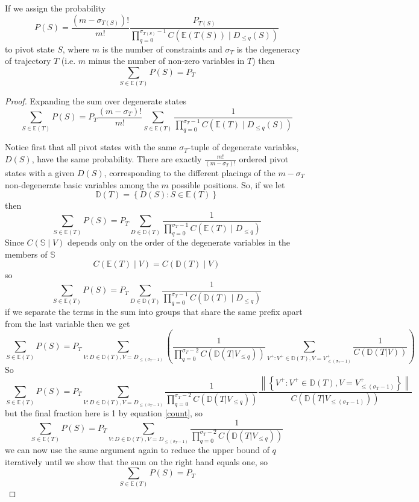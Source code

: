 \begin{theorem}
If we assign the probability
\begin{equation}
P(S) =  \frac{(m-\sigma_{T(S)})!}{m!} \frac{P_{T(S)}}{\prod_{q=0}^{\sigma_{T(S)}-1} C(\mathbb{E}(T(S)) \mid D_{\le q}(S))}
\label{pivotProb}
\end{equation}
to pivot state $S$, where $m$ is the number of constraints and $\sigma_{T}$ is the degeneracy of trajectory $T$ (i.e. $m$ minus the number of non-zero variables in $T$) then
\[
\sum_{S \in \mathbb{E}(T)} P(S) = P_{T}
\]
\end{theorem}
\begin{proof}
Expanding the sum over degenerate states
\[
\sum_{S \in \mathbb{E}(T)} P(S) =
P_T \frac{(m-\sigma_T)!}{m!} \sum_{S \in \mathbb{E}(T)} \frac{1}{\prod_{q=0}^{\sigma_T-1} C(\mathbb{E}(T) \mid D_{\le q}(S))}
\]

Notice first that all pivot states with the same $\sigma_T$-tuple of degenerate variables, $D(S)$, have the same probability. There are exactly $\frac{m!}{(m-\sigma_T)!}$ ordered pivot states with a given $D(S)$, corresponding to the different placings of the $m-\sigma_T$ non-degenerate basic variables among the $m$ possible positions. So, if we let
\[
\mathbb{D}(T) = \left\{ D(S) : S \in \mathbb{E}(T) \right\}
\]
then
\[
\sum_{S \in \mathbb{E}(T)} P(S) = P_T \sum_{D \in \mathbb{D}(T)} \frac{1}{\prod_{q=0}^{\sigma_T-1} C(\mathbb{E}(T) \mid D_{\le q})}
\]
Since $C(\mathbb{S} \mid V)$ depends only on the order of the degenerate variables in the members of $\mathbb{S}$
\[
C(\mathbb{E}(T) \mid V) = C(\mathbb{D}(T) \mid V)
\]
so
\begin{equation}
\sum_{S \in \mathbb{E}(T)} P(S) = P_T \sum_{D \in \mathbb{D}(T)} \frac{1}{\prod_{q=0}^{\sigma_T-1} C(\mathbb{D}(T) \mid D_{\le q})}
\label{normalForm}
\end{equation}
if we separate the terms in the sum into groups that share the same prefix apart from the last variable then we get
\[
\sum_{S \in \mathbb{E}(T)} P(S) = 
P_T \sum_{V : D \in \mathbb{D}(T), V = D_{\le (\sigma_T-1)}} 
\left(
\frac{1}{\prod_{q=0}^{\sigma_T-2} C(\mathbb{D}(T|V_{\le q}))}
\sum_{V^+: V^+ \in \mathbb{D}(T), V = V^+_{\le (\sigma_T-1)}}
\frac{1}{C(\mathbb{D}(T|V))}
\right)
\]
So
\[
\sum_{S \in \mathbb{E}(T)} P(S) = 
P_T \sum_{V : D \in \mathbb{D}(T), V = D_{\le (\sigma_T-1)}} 
\frac{1}{\prod_{q=0}^{\sigma_T-2} C(\mathbb{D}(T|V_{\le q}))}
\frac{\left\|\left\{V^+: V^+ \in \mathbb{D}(T), V = V^+_{\le (\sigma_T-1)}\right\}\right\|}{C(\mathbb{D}(T|V_{\le (\sigma_T-1)}))}
\]
but the final fraction here is 1 by equation \ref{count}, so
\[
\sum_{S \in \mathbb{E}(T)} P(S) = 
P_T \sum_{V : D \in \mathbb{D}(T), V = D_{\le (\sigma_T-1)}} 
\frac{1}{\prod_{q=0}^{\sigma_T-2} C(\mathbb{D}(T|V_{\le q}))}
\]
we can now use the same argument again to reduce the upper bound of $q$ iteratively until we show that the sum on the right hand equals one, so
\[
\sum_{S \in \mathbb{E}(T)} P(S) = P_T
\]
\end{proof}

